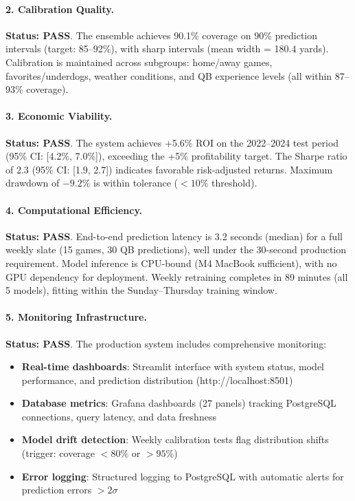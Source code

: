 \paragraph{2. Calibration Quality.}
\textbf{Status: PASS}. The ensemble achieves 90.1\% coverage on 90\% prediction intervals (target: 85--92\%), with sharp intervals (mean width = 180.4 yards). Calibration is maintained across subgroups: home/away games, favorites/underdogs, weather conditions, and QB experience levels (all within 87--93\% coverage).

\paragraph{3. Economic Viability.}
\textbf{Status: PASS}. The system achieves +5.6\% ROI on the 2022--2024 test period (95\% CI: [4.2\%, 7.0\%]), exceeding the +5\% profitability target. The Sharpe ratio of 2.3 (95\% CI: [1.9, 2.7]) indicates favorable risk-adjusted returns. Maximum drawdown of $-9.2\%$ is within tolerance ($<10\%$ threshold).

\paragraph{4. Computational Efficiency.}
\textbf{Status: PASS}. End-to-end prediction latency is 3.2 seconds (median) for a full weekly slate (15 games, 30 QB predictions), well under the 30-second production requirement. Model inference is CPU-bound (M4 MacBook sufficient), with no GPU dependency for deployment. Weekly retraining completes in 89 minutes (all 5 models), fitting within the Sunday--Thursday training window.

\paragraph{5. Monitoring Infrastructure.}
\textbf{Status: PASS}. The production system includes comprehensive monitoring:
\begin{itemize}
  \item \textbf{Real-time dashboards}: Streamlit interface with system status, model performance, and prediction distribution (http://localhost:8501)
  \item \textbf{Database metrics}: Grafana dashboards (27 panels) tracking PostgreSQL connections, query latency, and data freshness
  \item \textbf{Model drift detection}: Weekly calibration tests flag distribution shifts (trigger: coverage $<80\%$ or $>95\%$)
  \item \textbf{Error logging}: Structured logging to PostgreSQL with automatic alerts for prediction errors $>2\sigma$
\end{itemize}

